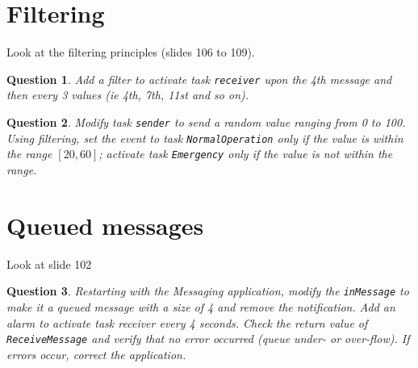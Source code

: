 \documentclass[11pt]{article}
\newtheorem{ex}{Question}
\begin{document}
\section{Filtering}

Look at the filtering principles (slides 106 to 109).

\begin{ex}
Add a filter to activate task \texttt{receiver} upon the 4th message and then every 3 values (ie 4th, 7th, 11st and so on).
\end{ex}
\begin{ex}
Modify task \texttt{sender} to send a random value ranging from 0 to 100. Using filtering, set the event to task \texttt{NormalOperation} only if the value is within the range $[20,60]$; activate task \texttt{Emergency} only if the value is not within the range.
\end{ex}

\section{Queued messages}

Look at slide 102

\begin{ex}Restarting with the Messaging application, modify the \texttt{inMessage} to make it a queued message with a size of 4 and remove the notification. Add an alarm to activate task receiver every 4 seconds. Check the return value of \texttt{ReceiveMessage} and verify that no error occurred (queue under- or over-flow). If errors occur, correct the application.
\end{ex}
\end{document}
